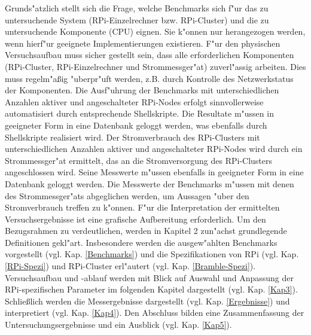 Grunds"atzlich stellt sich die Frage, welche Benchmarks sich f"ur das zu untersuchende System (RPi-Einzelrechner bzw. RPi-Cluster) und die zu untersuchende Komponente (CPU) eignen. Sie k"onnen nur herangezogen werden, wenn hierf"ur geeignete Implementierungen existieren. F"ur den physischen Versuchsaufbau muss sicher gestellt sein, dass alle erforderlichen Komponenten (RPi-Cluster, RPi-Einzelrechner und Strommessger"at) zuverl"assig arbeiten. Dies muss regelm"a\ss ig "uberpr"uft werden, z.B. durch Kontrolle des Netzwerkstatus der Komponenten. Die Ausf"uhrung der Benchmarks mit unterschiedlichen Anzahlen aktiver und angeschalteter RPi-Nodes erfolgt sinnvollerweise automatisiert durch entsprechende Shellskripte. Die Resultate m"ussen in geeigneter Form in eine Datenbank geloggt werden, was ebenfalls durch Shellskripte realisiert wird. Der Stromverbrauch des RPi-Clusters mit unterschiedlichen Anzahlen aktiver und angeschalteter RPi-Nodes wird durch ein Strommessger"at ermittelt, das an die Stromversorgung des RPi-Clusters angeschlossen wird. Seine Messwerte m"ussen ebenfalls in geeigneter Form in eine Datenbank geloggt werden. Die Messwerte der Benchmarks m"ussen mit denen des Strommessger"ats abgeglichen werden, um Aussagen "uber den Stromverbrauch treffen zu k"onnen. F"ur die Interpretation der ermittelten Versuchsergebnisse ist eine grafische Aufbereitung erforderlich.
\newpage
\noindent
Um den Bezugsrahmen zu verdeutlichen, werden in Kapitel 2 zun"achst grundlegende Definitionen gekl"art. Insbesondere werden die ausgew"ahlten Benchmarks vorgestellt (vgl. Kap. \ref{Benchmarks}) und die Spezifikationen von RPi (vgl. Kap. \ref{RPi-Spezi}) und RPi-Cluster erl"autert (vgl. Kap. \ref{Bramble-Spezi}). Versuchsaufbau und -ablauf werden mit Blick auf Auswahl und Anpassung der RPi-spezifischen Parameter im folgenden Kapitel dargestellt (vgl. Kap. \ref{Kap3}). Schlie\ss lich  werden die Messergebnisse dargestellt (vgl. Kap. \ref{Ergebnisse}) und interpretiert (vgl. Kap. \ref{Kap4}). Den Abschluss bilden eine Zusammenfassung der Untersuchungsergebnisse und ein Ausblick (vgl. Kap. \ref{Kap5}).

\endinput 
